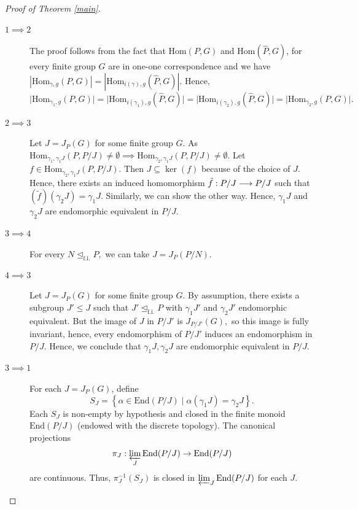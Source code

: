 \documentclass[10pt,a4paper]{amsart}
\begin{document}
\begin{proof}[Proof of Theorem \ref{main}]
\mbox{}
\begin{description}
    \item[$1 \implies 2$] The proof follows from the fact that $\mathrm{Hom}(P,G)$ and $\mathrm{Hom}(\widehat{P},G)$, for every finite group $G$ are in one-one correspondence and we have $| \mathrm{Hom}_{\gamma,g} (P,G)| = |\mathrm{Hom}_{i(\gamma),g}(\widehat{P}, G)|.$ Hence, $$ \vert \mathrm{Hom}_{\gamma_1,g} (P,G)| = |\mathrm{Hom}_{i(\gamma_1),g}(\widehat{P}, G)|  = |\mathrm{Hom}_{i(\gamma_2),g}(\widehat{P}, G)| = |\mathrm{Hom}_{\gamma_2,g} (P,G)|.$$
    \item [$2 \implies 3$] Let $J = J_P(G)$ for some finite group $G$. As $\mathrm{Hom}_{\gamma_1, \gamma_1J}(P, P/J)\neq \emptyset \implies \mathrm{Hom}_{\gamma_2, \gamma_1J}(P,P/J) \neq \emptyset$. Let $f \in \mathrm{Hom}_{\gamma_2, \gamma_1J}(P,P/J).$ Then $J \subseteq \ker(f)$ because of the choice of $J.$ Hence, there exists an induced homomorphism $\Tilde{f}: P/J \longrightarrow P/J$ such that $(\tilde f) (\gamma_2J) = \gamma_1J.$ Similarly, we can show the other way. Hence, $\gamma_1J$ and $\gamma_2J$ are endomorphic equivalent in $P/J$.
    \item [$3 \implies 4$] For every $N \unlhd_{\mathrm{f.i.}}P,$ we can take $J = J_P(P/N).$ 
    \item [$4 \implies 3$] Let $J = J_P(G)$ for some finite group $G.$ By assumption, there exists a subgroup $J' \le J$ such that $J' \unlhd_{\mathrm{f.i.}} P$ with $\gamma_1J'$ and $\gamma_2J'$ endomorphic equivalent. But the image of $J$ in $P/J'$ is $J_{P/J'}(G),$ so this image is fully invariant, hence, every endomorphism of $P/J'$ induces an endomorphism in $P/J$. Hence, we conclude that $\gamma_1J, \gamma_2J$ are endomorphic equivalent in $P/J.$
    \item [$3 \implies 1$] For each $J = J_P(G)$, define
$$
S_J = \left\{ \alpha \in \mathrm{End}(P/J) \mid \alpha(\gamma_1 J) = \gamma_2 J \right\}.
$$
Each $S_J$ is non-empty by hypothesis and closed in the finite monoid $\mathrm{End}(P/J)$ (endowed with the discrete topology). The canonical projections $$\pi_J: \varprojlim_{J} \mathrm{End}(P/J) \to \mathrm{End}(P/J)$$ are continuous. Thus, $\pi_J^{-1}(S_J)$ is closed in $\varprojlim_{J} \mathrm{End}(P/J)$ for each $J$.


\end{description}
\end{proof}
\end{document}
